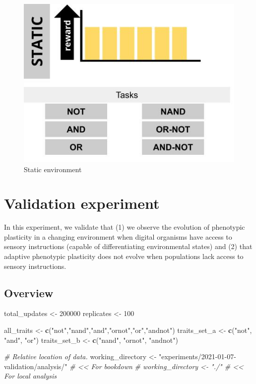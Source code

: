 \documentclass[]{book}
\newenvironment{Shaded}{\begin{snugshade}}{\end{snugshade}}
\newcommand{\CommentTok}[1]{\textcolor[rgb]{0.56,0.35,0.01}{\textit{#1}}}
\newcommand{\DecValTok}[1]{\textcolor[rgb]{0.00,0.00,0.81}{#1}}
\newcommand{\KeywordTok}[1]{\textcolor[rgb]{0.13,0.29,0.53}{\textbf{#1}}}
\newcommand{\NormalTok}[1]{#1}
\newcommand{\StringTok}[1]{\textcolor[rgb]{0.31,0.60,0.02}{#1}}
\begin{document}
\begin{figure}
\centering
\includegraphics{media/static-environment.jpg}
\caption{Static environment}
\end{figure}

\hypertarget{validation-experiment}{%
\chapter{Validation experiment}\label{validation-experiment}}

In this experiment, we validate that
(1) we observe the evolution of phenotypic plasticity in a changing environment when digital organisms have access to sensory instructions (capable of differentiating environmental states)
and (2) that adaptive phenotypic plasticity does not evolve when populations lack access to sensory instructions.

\hypertarget{overview}{%
\section{Overview}\label{overview}}

\begin{Shaded}
\begin{Highlighting}[]
\NormalTok{total_updates <-}\StringTok{ }\DecValTok{200000}
\NormalTok{replicates <-}\StringTok{ }\DecValTok{100}

\NormalTok{all_traits <-}\StringTok{ }\KeywordTok{c}\NormalTok{(}\StringTok{"not"}\NormalTok{,}\StringTok{"nand"}\NormalTok{,}\StringTok{"and"}\NormalTok{,}\StringTok{"ornot"}\NormalTok{,}\StringTok{"or"}\NormalTok{,}\StringTok{"andnot"}\NormalTok{)}
\NormalTok{traits_set_a <-}\StringTok{ }\KeywordTok{c}\NormalTok{(}\StringTok{"not"}\NormalTok{, }\StringTok{"and"}\NormalTok{, }\StringTok{"or"}\NormalTok{)}
\NormalTok{traits_set_b <-}\StringTok{ }\KeywordTok{c}\NormalTok{(}\StringTok{"nand"}\NormalTok{, }\StringTok{"ornot"}\NormalTok{, }\StringTok{"andnot"}\NormalTok{)}

\CommentTok{# Relative location of data.}
\NormalTok{working_directory <-}\StringTok{ "experiments/2021-01-07-validation/analysis/"} \CommentTok{# << For bookdown}
\CommentTok{# working_directory <- "./"                                              # << For local analysis}
\end{Highlighting}
\end{Shaded}
\end{document}
